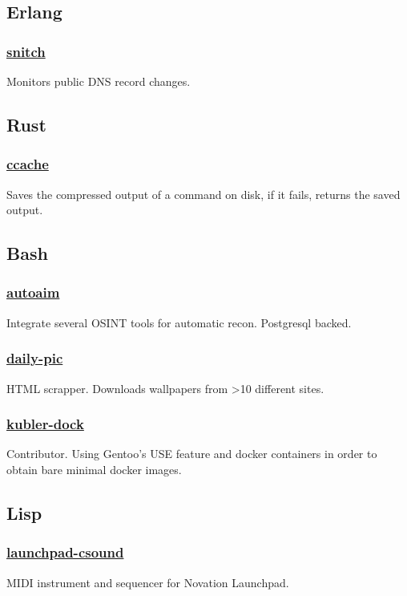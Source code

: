 \documentclass[11pt]{article}
\begin{document}
\subsection{Erlang}
\subsubsection{\href {https://github.com/azimut/snitch} {snitch}}
Monitors public DNS record changes.

\subsection{Rust}
\subsubsection{\href {https://github.com/azimut/ccache} {ccache}}
Saves the compressed output of a command on disk, if it fails, returns the saved output.

\subsection{Bash}
\subsubsection{\href {https://github.com/azimut/autoaim} {autoaim}}
Integrate several OSINT tools for automatic recon. Postgresql backed.
\subsubsection{\href {https://github.com/azimut/daily-pic} {daily-pic}}
HTML scrapper. Downloads wallpapers from >10 different sites.
\subsubsection{\href {https://github.com/azimut/kubler-dock} {kubler-dock}}
Contributor. Using Gentoo's USE feature and docker containers in order to obtain bare minimal docker images.

\subsection{Lisp}
\subsubsection{\href {https://github.com/azimut/launchpad-csound} {launchpad-csound}}
MIDI instrument and sequencer for Novation Launchpad.
\end{document}
